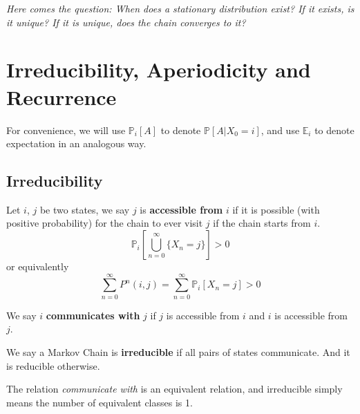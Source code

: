    \emph{Here comes the question: When does a stationary distribution exist? If it exists, is it unique? If it is unique, does the chain converges to it?}


\section{Irreducibility, Aperiodicity and Recurrence}
For convenience, we will use $\mathbb{P}_i[A]$ to denote $\mathbb{P}[A | X_0 = i]$, and use $\mathbb{E}_i$ to denote expectation in an analogous way.

    \subsection{Irreducibility}
    \begin{definition}[Accessibility]
        Let $i$, $j$ be two states, we say $j$ is \textbf{accessible from} $i$ if it is possible (with positive probability) for the chain to ever visit $j$ if the chain starts from $i$.
        \[ \mathbb{P}_i[\bigcup_{n=0}^\infty\{X_n = j\}] > 0 \]
        or equivalently
        \[ \sum_{n=0}^\infty P^n(i,j) = \sum_{n=0}^\infty \mathbb{P}_i[X_n = j] > 0 \]
    \end{definition}
    \begin{definition}[Communication]
        We say $i$ \textbf{communicates with} $j$ if $j$ is accessible from $i$ and $i$ is accessible from $j$.
    \end{definition}
    \begin{definition}[Irreducibility]
        We say a Markov Chain is \textbf{irreducible} if all pairs of states communicate. And it is reducible otherwise.
    \end{definition}
    The relation \emph{communicate with} is an equivalent relation, and irreducible simply means the number of equivalent classes is 1.

